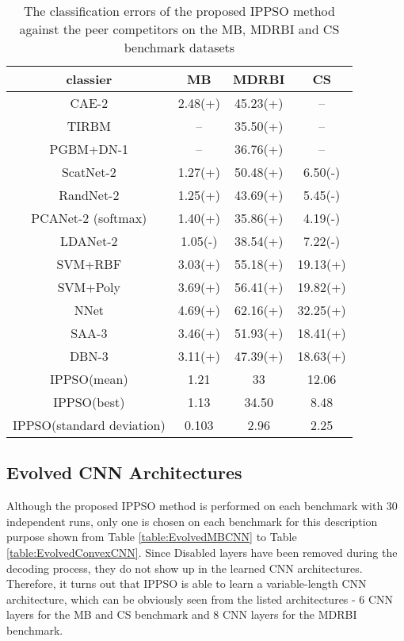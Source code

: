 \documentclass[conference]{IEEEtran}
\begin{document}
\begin{table}[!t]
	\renewcommand{\arraystretch}{1.3}
	\caption{The classification errors of the proposed IPPSO method against the peer competitors on the MB, MDRBI and CS benchmark datasets}
	\label{table:ResultComparison}
	\centering
	\begin{tabular}{|c|c|c|c|}
		\hline
		classier & MB & MDRBI & CS\\
		\hline
		CAE-2 & 2.48(+) & 45.23(+) & --\\
		\hline
		TIRBM & -- & 35.50(+) & --\\
		\hline
		PGBM+DN-1 & -- & 36.76(+) & --\\
		\hline
		ScatNet-2 & 1.27(+) & 50.48(+) & 6.50(-)\\
		\hline
		RandNet-2 & 1.25(+) & 43.69(+) & 5.45(-)\\
		\hline
		PCANet-2 (softmax)  & 1.40(+) & 35.86(+) & 4.19(-)\\
		\hline
		LDANet-2 & 1.05(-) & 38.54(+) & 7.22(-)\\
		\hline
		SVM+RBF & 3.03(+) & 55.18(+) & 19.13(+)\\
		\hline
		SVM+Poly & 3.69(+) & 56.41(+) & 19.82(+)\\
		\hline
		NNet & 4.69(+) & 62.16(+) & 32.25(+)\\
		\hline
		SAA-3 & 3.46(+) & 51.93(+) & 18.41(+)\\
		\hline
		DBN-3  & 3.11(+) & 47.39(+) & 18.63(+)\\
		\hline
		IPPSO(mean) & 1.21 & 33 & 12.06\\
		\hline
		IPPSO(best) & 1.13 & 34.50 & 8.48\\
		\hline
		IPPSO(standard deviation) & 0.103 & 2.96 & 2.25\\
		\hline
	\end{tabular}
\end{table}


\subsection{Evolved CNN Architectures}\label{sec:EvolvedCNN}

Although the proposed IPPSO method is performed on each benchmark with 30 independent runs, only one is chosen on each benchmark for this description purpose shown from Table \ref{table:EvolvedMBCNN} to Table \ref{table:EvolvedConvexCNN}. Since Disabled layers have been removed during the decoding process, they do not show up in the learned CNN architectures. Therefore, it turns out that IPPSO is able to learn a variable-length CNN architecture, which can be obviously seen from the listed architectures - 6 CNN layers for the MB and CS benchmark and 8 CNN layers for the MDRBI benchmark.
\end{document}
